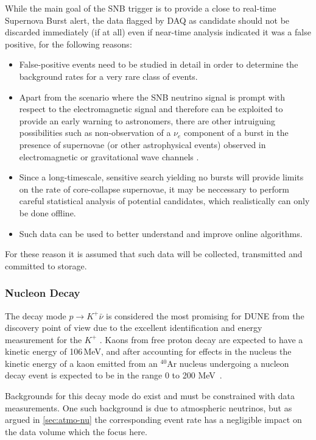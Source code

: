 While the main goal of the SNB trigger is to provide a close to real-time Supernova Burst alert, the data
flagged by DAQ as candidate should not be discarded immediately (if at all) even if near-time analysis indicated it was a false positive,
for the following reasons:
\begin{itemize}

\item False-positive events need to be studied in detail in order to determine the background
rates for a very rare class of events.

\item Apart from the scenario where the SNB neutrino signal is prompt with respect to the electromagnetic signal
and therefore can be exploited to provide an early warning to astronomers, there are other intruiguing possibilities
such as non-observation of a $\nu_e$ component of a burst in the presence
of supernovae (or other astrophysical events) observed in electromagnetic or gravitational wave
channels \cite{cdr_vol2}.

\item Since a long-timescale, sensitive search yielding no bursts will provide limits on the rate of core-collapse
supernovae, it may be neccessary to perform careful statistical analysis of potential candidates, which realistically can only
be done offline.

\item Such data can be used to better understand and improve online algorithms.

\end{itemize}

For these reason it is assumed that such data will be collected, transmitted and committed to storage.

\subsubsection{Nucleon Decay}
\label{sec:pdk-data}
The decay mode $p \rightarrow K^+\bar{\nu}$ is considered the most promising
for DUNE  from the discovery point of view due to the excellent  
identification and energy measurement for the $K^+$ \cite{cdr_vol2}.
Kaons from free proton decay are expected to have a kinetic
energy of 106\,MeV, and after accounting for effects in the nucleus the kinetic energy of a kaon
emitted from an $^{40}$Ar nucleus undergoing a nucleon decay event is expected to be in the range
0 to 200 MeV~\cite{muon_bkgd_pdk}.

Backgrounds for this decay mode do exist and must be constrained with data measurements.
One such background is due to atmospheric neutrinos,
but as argued in \ref{sec:atmo-nu} the corresponding event rate has a negligible impact on the
data volume which the focus here.

